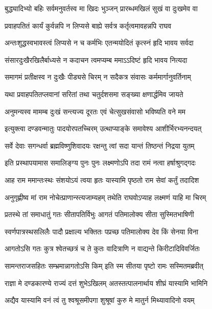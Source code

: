 \twolineshloka
{बुद्ध्यादिभ्यो बहिः सर्वमनुवर्तस्व मा खिदः}
{भुञ्जन् प्रारब्धमखिलं सुखं वा दुःखमेव वा} %

\twolineshloka
{प्रवाहपतितं कार्यं कुर्वन्नपि न लिप्यसे}
{बाह्ये सर्वत्र कर्तृत्वमावहन्नपि राघव} %

\twolineshloka
{अन्तःशुद्धस्वभावस्त्वं लिप्यसे न च कर्मभिः}
{एतन्मयोदितं कृत्स्नं हृदि भावय सर्वदा} %

\twolineshloka
{संसारदुःखैरखिलैर्बाध्यसे न कदाचन}
{त्वमप्यम्ब ममाऽऽदिष्टं हृदि भावय नित्यदा} %

\twolineshloka
{समागमं प्रतीक्षस्व न दुःखैः पीड्यसे चिरम्}
{न सदैकत्र संवासः कर्ममार्गानुवर्तिनाम्} %

\twolineshloka
{यथा प्रवाहपतितप्लवानां सरितां तथा}
{चतुर्दशसमा सङ्ख्या क्षणार्द्धमिव जायते} %

\twolineshloka
{अनुमन्यस्व मामम्ब दुःखं सन्त्यज्य दूरतः}
{एवं चेत्सुखसंवासो भविष्यति वने मम} %

\twolineshloka
{इत्युक्त्वा दण्डवन्मातुः पादयोरपतच्चिरम्}
{उत्थाप्याङ्के समावेश्य आशीर्भिरभ्यनन्दयत्} %

\twolineshloka
{सर्वे देवाः सगन्धर्वा ब्रह्मविष्णुशिवादयः}
{रक्षन्तु त्वां सदा यान्तं तिष्ठन्तं निद्रया युतम्} %

\twolineshloka
{इति प्रस्थापयामास समालिङ्ग्य पुनः पुनः}
{लक्ष्मणोऽपि तदा रामं नत्वा हर्षाश्रुगद्गदः} %

\twolineshloka
{आह राम ममान्तःस्थः संशयोऽयं त्वया हृतः}
{यास्यामि पृष्ठतो राम सेवां कर्तुं तदादिश} %

\twolineshloka
{अनुगृह्णीष्व मां राम नोचेत्प्राणान्स्त्यजाम्यहम्}
{तथेति राघवोऽप्याह लक्ष्मणं याहि मा चिरम्} %

\twolineshloka
{प्रतस्थे तां समाधातुं गतः सीतापतिर्विभुः}
{आगतं पतिमालोक्य सीता सुस्मितभाषिणी} %

\twolineshloka
{स्वर्णपात्रस्थसलिलैः पादौ प्रक्षाल्य भक्तितः}
{पप्रच्छ पतिमालोक्य देव किं सेनया विना} %

\twolineshloka
{आगतोऽसि गतः कुत्र श्वेतच्छत्रं च ते कुतः}
{वादित्राणि न वाद्यन्ते किरीटादिविवर्जितः} %

\twolineshloka
{सामन्तराजसहितः सम्भ्रमान्नागतोऽसि किम्}
{इति स्म सीतया पृष्टो रामः सस्मितमब्रवीत्} %

\twolineshloka
{राज्ञा मे दण्डकारण्ये राज्यं दत्तं शुभेऽखिलम्}
{अतस्तत्पालनार्थाय शीघ्रं यास्यामि भामिनि} %

\twolineshloka
{अद्यैव यास्यामि वनं त्वं तु श्वश्रूसमीपगा}
{शुश्रूषां कुरु मे मातुर्न मिथ्यावादिनो वयम्} %


